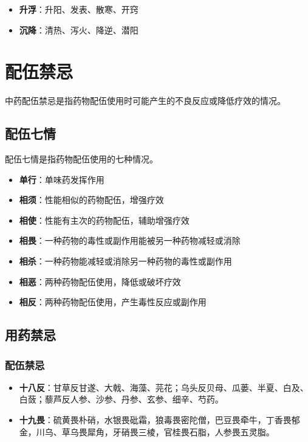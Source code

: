 \documentclass[12pt,UTF8]{ctexbook}
\begin{document}
\begin{itemize}
\item \textbf{升浮}：升阳、发表、散寒、开窍
\item \textbf{沉降}：清热、泻火、降逆、潜阳
\end{itemize}

\section{配伍禁忌}

中药配伍禁忌是指药物配伍使用时可能产生的不良反应或降低疗效的情况。

\subsection{配伍七情}

配伍七情是指药物配伍使用的七种情况。

\begin{itemize}
\item \textbf{单行}：单味药发挥作用
\item \textbf{相须}：性能相似的药物配伍，增强疗效
\item \textbf{相使}：性能有主次的药物配伍，辅助增强疗效
\item \textbf{相畏}：一种药物的毒性或副作用能被另一种药物减轻或消除
\item \textbf{相杀}：一种药物能减轻或消除另一种药物的毒性或副作用
\item \textbf{相恶}：两种药物配伍使用，降低或破坏疗效
\item \textbf{相反}：两种药物配伍使用，产生毒性反应或副作用
\end{itemize}

\subsection{用药禁忌}

\subsubsection{配伍禁忌}

\begin{itemize}
\item \textbf{十八反}：甘草反甘遂、大戟、海藻、芫花；乌头反贝母、瓜蒌、半夏、白及、白蔹；藜芦反人参、沙参、丹参、玄参、细辛、芍药。
\item \textbf{十九畏}：硫黄畏朴硝，水银畏砒霜，狼毒畏密陀僧，巴豆畏牵牛，丁香畏郁金，川乌、草乌畏犀角，牙硝畏三棱，官桂畏石脂，人参畏五灵脂。
\end{itemize}
\end{document}
